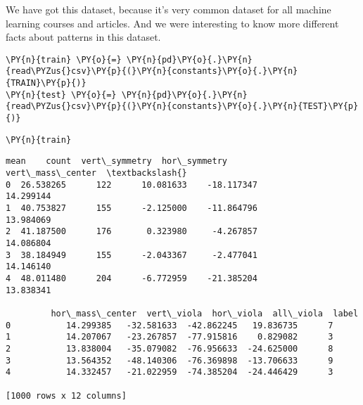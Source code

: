 We have got this dataset, because it's very common dataset for all machine learning courses and articles. And we were interesting to know more different facts about patterns in this dataset.

\begin{tcolorbox}[breakable, size=fbox, boxrule=1pt, pad at break*=1mm,colback=cellbackground, colframe=cellborder]
\begin{Verbatim}[commandchars=\\\{\}]
\PY{n}{train} \PY{o}{=} \PY{n}{pd}\PY{o}{.}\PY{n}{read\PYZus{}csv}\PY{p}{(}\PY{n}{constants}\PY{o}{.}\PY{n}{TRAIN}\PY{p}{)}
\PY{n}{test} \PY{o}{=} \PY{n}{pd}\PY{o}{.}\PY{n}{read\PYZus{}csv}\PY{p}{(}\PY{n}{constants}\PY{o}{.}\PY{n}{TEST}\PY{p}{)}
\end{Verbatim}
\end{tcolorbox}

    \begin{tcolorbox}[breakable, size=fbox, boxrule=1pt, pad at break*=1mm,colback=cellbackground, colframe=cellborder]
\begin{Verbatim}[commandchars=\\\{\}]
\PY{n}{train}
\end{Verbatim}
\end{tcolorbox}

            \begin{tcolorbox}[breakable, size=fbox, boxrule=.5pt, pad at break*=1mm, opacityfill=0]
\begin{Verbatim}[commandchars=\\\{\}]
        mean    count  vert\_symmetry  hor\_symmetry          vert\_mass\_center  \textbackslash{}
0  26.538265      122      10.081633    -18.117347              14.299144
1  40.753827      155      -2.125000    -11.864796              13.984069
2  41.187500      176       0.323980     -4.267857              14.086804
3  38.184949      155      -2.043367     -2.477041              14.146140
4  48.011480      204      -6.772959    -21.385204              13.838341

         hor\_mass\_center  vert\_viola  hor\_viola  all\_viola  label
0           14.299385   -32.581633  -42.862245   19.836735      7
1           14.207067   -23.267857  -77.915816    0.829082      3
2           13.838004   -35.079082  -76.956633  -24.625000      8
3           13.564352   -48.140306  -76.369898  -13.706633      9
4           14.332457   -21.022959  -74.385204  -24.446429      3

[1000 rows x 12 columns]
\end{Verbatim}

\end{tcolorbox}



